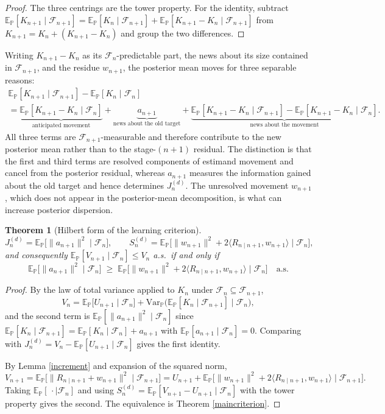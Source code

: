 \documentclass{article}
\newcommand{\Var}{\mathrm{Var}_{\mathbb{P}}}
\newcommand{\E}{\mathbb{E}_{\mathbb{P}}}
\newcommand{\F}{\mathcal{F}}
\newcommand{\1}{\mathbbm{1}}
\newtheorem{theorem}{Theorem}
\begin{document}
\begin{proof}
The three centrings are the tower property. For the identity, subtract
$\E[K_{n+1}\mid\F_{n+1}]=\E[K_n\mid\F_{n+1}]+\E[K_{n+1}-K_n\mid\F_{n+1}]$ from
$K_{n+1}=K_n+(K_{n+1}-K_n)$ and group the two differences.
\end{proof}

Writing $K_{n+1}-K_n$ as its $\F_n$-predictable part, the news about its size contained in
$\F_{n+1}$, and the residue $w_{n+1}$, the posterior mean moves for three separable reasons:
\begin{gather*}
\E[K_{n+1}\mid\F_{n+1}]-\E[K_n\mid\F_n]
\\=\underbrace{\E[K_{n+1}-K_n\mid\F_n]}_{\text{anticipated movement}}
+\underbrace{a_{n+1}}_{\text{news about the old target}}
+\underbrace{\E[K_{n+1}-K_n\mid\F_{n+1}]-\E[K_{n+1}-K_n\mid\F_n]}_{\text{news about the movement}} .
\end{gather*}
All three terms are $\F_{n+1}$-measurable and therefore contribute to the new posterior mean rather than to the stage-$(n+1)$ residual. The distinction is that the first and third terms are resolved components of estimand movement and cancel from the posterior residual, whereas $a_{n+1}$ measures the information gained about the old target and hence determines $J_n^{(d)}$. The unresolved movement $w_{n+1}$, which does not appear in the posterior-mean decomposition, is what can increase posterior dispersion.

\begin{theorem}[Hilbert form of the learning criterion]
\label{hilbcriterion}
\[
J_n^{(d)}=\E\big[\|a_{n+1}\|^2\mid\F_n\big],
\qquad
S_n^{(d)}=\E\big[\|w_{n+1}\|^2+2\langle R_{n\mid n+1},w_{n+1}\rangle\mid\F_n\big],
\]
and consequently $\E[V_{n+1}\mid\F_n]\le V_n$ a.s.\ if and only if
\[
\E\big[\|a_{n+1}\|^2\mid\F_n\big]\;\ge\;
\E\big[\|w_{n+1}\|^2+2\langle R_{n\mid n+1},w_{n+1}\rangle\mid\F_n\big]\quad\text{a.s.}
\]
\end{theorem}

\begin{proof}
By the law of total variance applied to $K_n$ under $\F_n\subseteq\F_{n+1}$,
\[
V_n=\E\big[U_{n+1}\mid\F_n\big]+\Var\big(\E[K_n\mid\F_{n+1}]\;\big|\;\F_n\big),
\]
and the second term is $\E[\|a_{n+1}\|^2\mid\F_n]$ since $\E[K_n\mid\F_{n+1}]=\E[K_n\mid\F_n]+a_{n+1}$
with $\E[a_{n+1}\mid\F_n]=0$. Comparing with $J_n^{(d)}=V_n-\E[U_{n+1}\mid\F_n]$ gives the first
identity.

By Lemma \ref{increment} and expansion of the squared norm,
\[
V_{n+1}=\E\big[\|R_{n\mid n+1}+w_{n+1}\|^2\mid\F_{n+1}\big]
=U_{n+1}+\E\big[\|w_{n+1}\|^2+2\langle R_{n\mid n+1},w_{n+1}\rangle\mid\F_{n+1}\big].
\]
Taking $\E[\,\cdot\mid\F_n]$ and using $S_n^{(d)}=\E[V_{n+1}-U_{n+1}\mid\F_n]$ with the tower
property gives the second. The equivalence is Theorem \ref{maincriterion}.
\end{proof}
\end{document}
